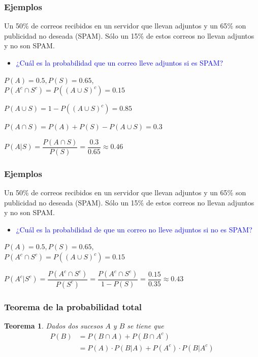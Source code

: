 \documentclass[handout]{beamer}\usepackage[]{graphicx}\usepackage[]{color}
\newcommand{\blue}[1]{\textcolor{blue}{#1}}
\renewcommand{\emph}[1]{{\color{red}#1}}
\theoremstyle{plain}
\newtheorem{teorema}{Teorema}
\theoremstyle{definition}
\begin{document}
\begin{frame}
\frametitle{Ejemplos}

Un 50\% de  correos recibidos en un servidor que  llevan adjuntos  y un 65\% son  publicidad no deseada (SPAM). Sólo un 15\% de estos correos no llevan adjuntos y no son SPAM. 

\begin{itemize}
\item \blue{¿Cuál es la probabilidad que un correo lleve adjuntos si es SPAM?}

\end{itemize}

$P(A)=0.5, P(S)=0.65$,\\ $P(A^c\cap S^c)=P((A\cup S)^c)=0.15$
\medskip

$P(A\cup S)=1-P((A\cup S)^c)=0.85$
\medskip

$P(A\cap S)=P(A)+P(S)-P(A\cup S)=0.3$
\medskip

$P(A|S)=\dfrac{P(A\cap S)}{P(S)}=\dfrac{0.3}{0.65}\approx 0.46$


\end{frame}


\begin{frame}
\frametitle{Ejemplos}

Un 50\% de  correos recibidos en un servidor que  llevan adjuntos  y un 65\% son  publicidad no deseada (SPAM). Sólo un 15\% de estos correos no llevan adjuntos y no son SPAM. 

\begin{itemize}
\item \blue{¿Cuál  es la probabilidad de que un correo no lleve adjuntos si  no es SPAM?}
\end{itemize}

$P(A)=0.5, P(S)=0.65$,\\ $P(A^c\cap S^c)=P((A\cup S)^c)=0.15$
\medskip


$P(A^c|S^c)=\dfrac{P(A^c\cap S^c)}{P(S^c)}=\dfrac{P(A^c\cap S^c)}{1-P(S)}=\dfrac{0.15}{0.35}\approx 0.43$


\end{frame}


\begin{frame}
\frametitle{Teorema de la probabilidad total}  

\begin{teorema}
Dados dos sucesos $A$ y $B$ se tiene que 
{\small $$
\begin{array}{rl}
P(B)&= P(B\cap A) +P(B\cap A^c)\\
& =P(A)\cdot P(B|A)+ P(A^c)\cdot P(B|A^c)
\end{array}
$$
}\end{teorema}


\end{frame}
\end{document}
